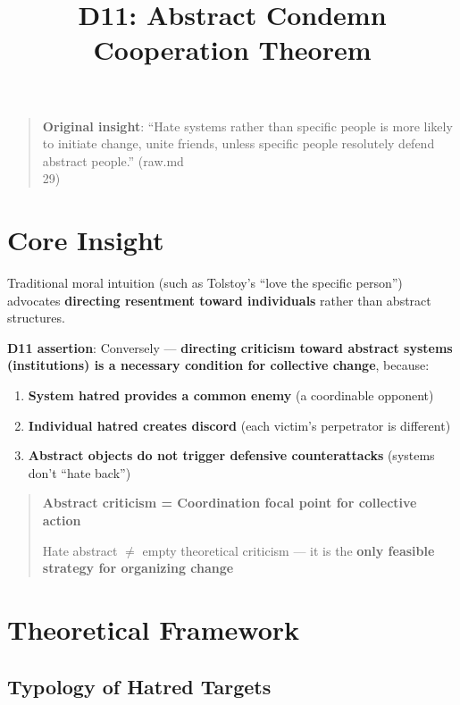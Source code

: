 \documentclass[12pt,a4paper]{article}
\begin{document}
\title{D11: Abstract Condemn Cooperation Theorem}
\author{}
\date{}
\maketitle

\begin{quote}
\textbf{Original insight}: ``Hate systems rather than specific people is more likely to initiate change, unite friends, unless specific people resolutely defend abstract people.'' (raw.md \\29)
\end{quote}

\section{Core Insight}

Traditional moral intuition (such as Tolstoy's ``love the specific person'') advocates \textbf{directing resentment toward individuals} rather than abstract structures.

\textbf{D11 assertion}: Conversely — \textbf{directing criticism toward abstract systems (institutions) is a necessary condition for collective change}, because:
\begin{enumerate}
    \item \textbf{System hatred provides a common enemy} (a coordinable opponent)
    \item \textbf{Individual hatred creates discord} (each victim's perpetrator is different)
    \item \textbf{Abstract objects do not trigger defensive counterattacks} (systems don't ``hate back'')
\end{enumerate}

\begin{quote}
\textbf{Abstract criticism = Coordination focal point for collective action}

Hate abstract $\neq$ empty theoretical criticism — it is the \textbf{only feasible strategy for organizing change}
\end{quote}

\section{Theoretical Framework}

\subsection{Typology of Hatred Targets}
\end{document}
